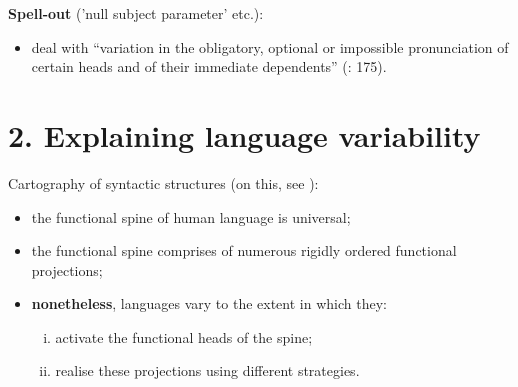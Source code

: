 \documentclass[fleqn,10pt]{wlscirep}
\begin{document}
\noindent\textbf{Spell-out} ('null subject parameter' etc.): 
\begin{itemize}
    \item \vspace*{-2mm} deal with “variation in the obligatory, optional or impossible pronunciation of certain heads and of their immediate dependents” (\citealt{rizzi2017}: 175). 
\end{itemize}

\section*{2. Explaining language variability}

Cartography of syntactic structures (on this, see \citealt{cinquerizzi2010,rizzicinque2016}):
\begin{itemize}
    \item \vspace*{-2mm} the functional spine of human language is universal;
    \item \vspace*{-2mm} the functional spine comprises of numerous rigidly ordered functional projections;
    \item \vspace*{-2mm} \textbf{nonetheless}, languages vary to the extent in which they:
        \begin{enumerate}[i.]
            \item \vspace*{-2mm} activate the functional heads of the spine;
            \item \vspace*{-2mm} realise these projections using different strategies. 
        \end{enumerate}
\end{itemize}
\end{document}
